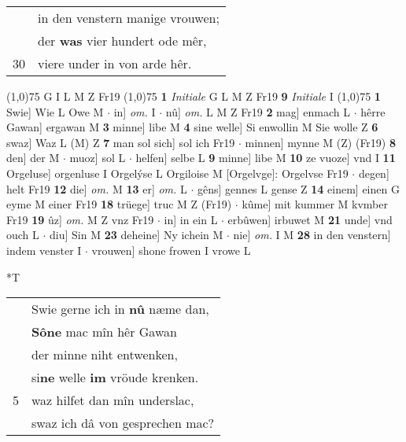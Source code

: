 \documentclass[8pt,a4paper,notitlepage]{article}
\begin{document}
\begin{table}[ht]
\begin{minipage}[t]{0.5\linewidth}
\begin{tabular}{rl}
 & in den venstern manige vrouwen;\\ 
 & der \textbf{was} vier hundert ode mêr,\\ 
30 & viere under in von arde hêr.\\ 
\end{tabular}
\scriptsize
\line(1,0){75} \newline
G I L M Z Fr19 \newline
\line(1,0){75} \newline
\textbf{1} \textit{Initiale} G L M Z Fr19  \textbf{9} \textit{Initiale} I  \newline
\line(1,0){75} \newline
\textbf{1} Swie] Wie L Owe M  $\cdot$ in] \textit{om.} I  $\cdot$ nû] \textit{om.} L M Z Fr19 \textbf{2} mag] enmach L  $\cdot$ hêrre Gawan] ergawan M \textbf{3} minne] libe M \textbf{4} sine welle] Si enwollin M Sie wolle Z \textbf{6} swaz] Waz L (M) Z \textbf{7} man sol sich] sol ich Fr19  $\cdot$ minnen] mynne M (Z) (Fr19) \textbf{8} den] der M  $\cdot$ muoz] sol L  $\cdot$ helfen] selbe L \textbf{9} minne] libe M \textbf{10} ze vuoze] vnd I \textbf{11} Orgeluse] orgenluse I Orgelýse L Orgiloise M [Orgelvge]: Orgelvse Fr19  $\cdot$ degen] helt Fr19 \textbf{12} die] \textit{om.} M \textbf{13} er] \textit{om.} L  $\cdot$ gêns] gennes L gense Z \textbf{14} einem] einen G eyme M einer Fr19 \textbf{18} trüege] truc M Z (Fr19)  $\cdot$ kûme] mit kummer M kvmber Fr19 \textbf{19} ûz] \textit{om.} M Z vnz Fr19  $\cdot$ in] in ein L  $\cdot$ erbûwen] irbuwet M \textbf{21} unde] vnd ouch L  $\cdot$ diu] Sin M \textbf{23} deheine] Ny ichein M  $\cdot$ nie] \textit{om.} I M \textbf{28} in den venstern] indem venster I  $\cdot$ vrouwen] shone frowen I vrowe L \newline
\end{minipage}
\hspace{0.5cm}
\begin{minipage}[t]{0.5\linewidth}
\small
\begin{center}*T
\end{center}
\begin{tabular}{rl}
 & Swie gerne ich in \textbf{nû} næme dan,\\ 
 & \textbf{Sône} mac mîn hêr Gawan\\ 
 & der minne niht entwenken,\\ 
 & si\textbf{ne} welle \textbf{im} vröude krenken.\\ 
5 & waz hilfet dan mîn underslac,\\ 
 & swaz ich dâ von gesprechen mac?\\ 

\end{tabular}
\end{minipage}
\end{table}
\end{document}
